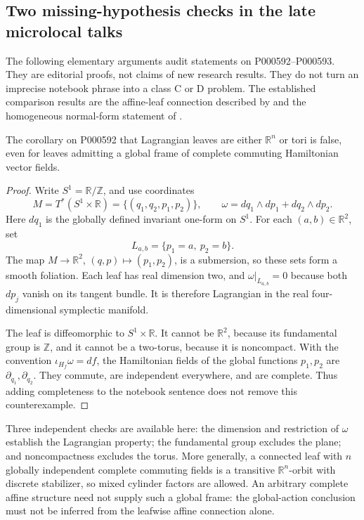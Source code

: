 \subsection{Two missing-hypothesis checks in the late microlocal talks}

The following elementary arguments audit statements on P000592--P000593.
They are editorial proofs, not claims of new research results. They do not
turn an imprecise notebook phrase into a class C or D problem. The
established comparison results are the affine-leaf connection described by
\citet[Proposition 1.9 and Theorem 1.10]{loustausanders2017bilagrangian}
and the homogeneous normal-form statement of
\citet[Proposition 6.1.4]{duistermaathormander1972fourierii}.

\begin{proposition}\ours
The corollary on P000592 that Lagrangian leaves are either
\(\mathbb R^n\) or tori is false, even for leaves admitting a global
frame of complete commuting Hamiltonian vector fields.
\end{proposition}

\begin{proof}
Write \(S^1=\mathbb R/\mathbb Z\), and use coordinates
\[
 M=T^*(S^1\times\mathbb R)
   =\{(q_1,q_2,p_1,p_2)\},\qquad
 \omega=dq_1\wedge dp_1+dq_2\wedge dp_2 .
\]
Here \(dq_1\) is the globally defined invariant one-form on \(S^1\).
For each \((a,b)\in\mathbb R^2\), set
\[
 L_{a,b}=\{p_1=a,\ p_2=b\}.
\]
The map \(M\to\mathbb R^2\), \((q,p)\mapsto(p_1,p_2)\), is a
submersion, so these sets form a smooth foliation. Each leaf has real
dimension two, and \(\omega|_{L_{a,b}}=0\) because both \(dp_j\) vanish
on its tangent bundle. It is therefore Lagrangian in the real
four-dimensional symplectic manifold.

The leaf is diffeomorphic to \(S^1\times\mathbb R\). It cannot be
\(\mathbb R^2\), because its fundamental group is \(\mathbb Z\), and
it cannot be a two-torus, because it is noncompact. With the convention
\(\iota_{H_f}\omega=df\), the Hamiltonian fields of the global functions
\(p_1,p_2\) are \(\partial_{q_1},\partial_{q_2}\). They commute, are
independent everywhere, and are complete. Thus adding completeness to
the notebook sentence does not remove this counterexample.
\end{proof}

\begin{remark}
Three independent checks are available here: the dimension and
restriction of \(\omega\) establish the Lagrangian property; the
fundamental group excludes the plane; and noncompactness excludes the
torus. More generally, a connected leaf with \(n\) globally independent
complete commuting fields is a transitive \(\mathbb R^n\)-orbit with
discrete stabilizer, so mixed cylinder factors are allowed. An
arbitrary complete affine structure need not supply such a global frame:
the global-action conclusion must not be inferred from the
leafwise affine connection alone.
\end{remark}


